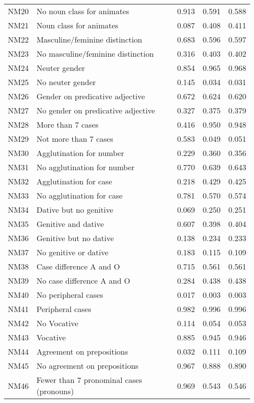 \begin{longtable}{lllll}
NM20 & No noun class for animates & 0.913 & 0.591 & 0.588\\
NM21 & Noun class for animates & 0.087 & 0.408 & 0.411\\
NM22 & Masculine/feminine distinction & 0.683 & 0.596 & 0.597\\
NM23 & No masculine/feminine distinction & 0.316 & 0.403 & 0.402\\
NM24 & Neuter gender & 0.854 & 0.965 & 0.968\\
NM25 & No neuter gender & 0.145 & 0.034 & 0.031\\
NM26 & Gender on predicative adjective & 0.672 & 0.624 & 0.620\\
NM27 & No gender on predicative adjective & 0.327 & 0.375 & 0.379\\
NM28 & More than 7 cases & 0.416 & 0.950 & 0.948\\
NM29 & Not more than 7 cases & 0.583 & 0.049 & 0.051\\
NM30 & Agglutination for number & 0.229 & 0.360 & 0.356\\
NM31 & No agglutination for number & 0.770 & 0.639 & 0.643\\
NM32 & Agglutination for case & 0.218 & 0.429 & 0.425\\
NM33 & No agglutination for case & 0.781 & 0.570 & 0.574\\
NM34 & Dative but no genitive & 0.069 & 0.250 & 0.251\\
NM35 & Genitive and dative & 0.607 & 0.398 & 0.404\\
NM36 & Genitive but no dative & 0.138 & 0.234 & 0.233\\
NM37 & No genitive or dative & 0.183 & 0.115 & 0.109\\
NM38 & Case difference A and O & 0.715 & 0.561 & 0.561\\
NM39 & No case difference A and O & 0.284 & 0.438 & 0.438\\
NM40 & No peripheral cases & 0.017 & 0.003 & 0.003\\
NM41 & Peripheral cases & 0.982 & 0.996 & 0.996\\
NM42 & No Vocative & 0.114 & 0.054 & 0.053\\
NM43 & Vocative & 0.885 & 0.945 & 0.946\\
NM44 & Agreement on prepositions & 0.032 & 0.111 & 0.109\\
NM45 & No agreement on prepositions & 0.967 & 0.888 & 0.890\\
NM46 & Fewer than 7 pronominal cases (pronouns) & 0.969 & 0.543 & 0.546\\

\end{longtable}
